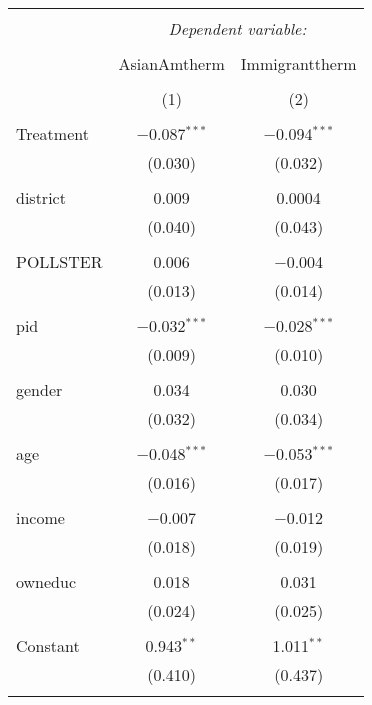 
\begin{table}[!htbp] \centering 
  \caption{} 
  \label{} 
\begin{tabular}{@{\extracolsep{5pt}}lcc} 
\\[-1.8ex]\hline 
\hline \\[-1.8ex] 
 & \multicolumn{2}{c}{\textit{Dependent variable:}} \\ 
\cline{2-3} 
\\[-1.8ex] & AsianAmtherm & Immigranttherm \\ 
\\[-1.8ex] & (1) & (2)\\ 
\hline \\[-1.8ex] 
 Treatment & $-$0.087$^{***}$ & $-$0.094$^{***}$ \\ 
  & (0.030) & (0.032) \\ 
  & & \\ 
 district & 0.009 & 0.0004 \\ 
  & (0.040) & (0.043) \\ 
  & & \\ 
 POLLSTER & 0.006 & $-$0.004 \\ 
  & (0.013) & (0.014) \\ 
  & & \\ 
 pid & $-$0.032$^{***}$ & $-$0.028$^{***}$ \\ 
  & (0.009) & (0.010) \\ 
  & & \\ 
 gender & 0.034 & 0.030 \\ 
  & (0.032) & (0.034) \\ 
  & & \\ 
 age & $-$0.048$^{***}$ & $-$0.053$^{***}$ \\ 
  & (0.016) & (0.017) \\ 
  & & \\ 
 income & $-$0.007 & $-$0.012 \\ 
  & (0.018) & (0.019) \\ 
  & & \\ 
 owneduc & 0.018 & 0.031 \\ 
  & (0.024) & (0.025) \\ 
  & & \\ 
 Constant & 0.943$^{**}$ & 1.011$^{**}$ \\ 
  & (0.410) & (0.437) \\ 
  & & \\ 

\end{tabular}
\end{table}
